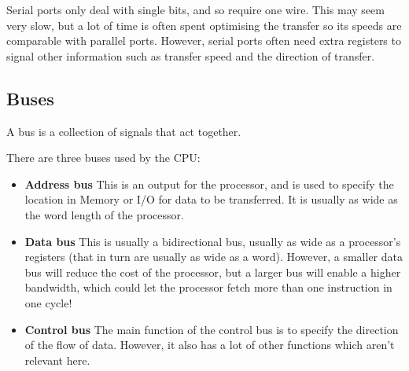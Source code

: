 \documentclass{article}
\begin{document}
Serial ports only deal with single bits, and so require one wire. This may seem
very slow, but a lot of time is often spent optimising the transfer so its
speeds are comparable with parallel ports. However, serial ports often need
extra registers to signal other information such as transfer speed and the
direction of transfer.

\subsection{Buses}

A bus is a collection of signals that act together.

There are three buses used by the CPU:

\begin{itemize}
	\item {\bf Address bus}
		This is an output for the processor, and is used to specify the location
		in Memory or I/O for data to be transferred. It is usually as wide as
		the word length of the processor.
	
	\item {\bf Data bus}
		This is usually a bidirectional bus, usually as wide as a processor's
		registers (that in turn are usually as wide as a word). However, a
		smaller data bus will reduce the cost of the processor, but a larger bus
		will enable a higher bandwidth, which could let the processor fetch more
		than one instruction in one cycle!

	\item {\bf Control bus}
		The main function of the control bus is to specify the direction of the
		flow of data. However, it also has a lot of other functions which aren't
		relevant here.
\end{itemize}
\end{document}
